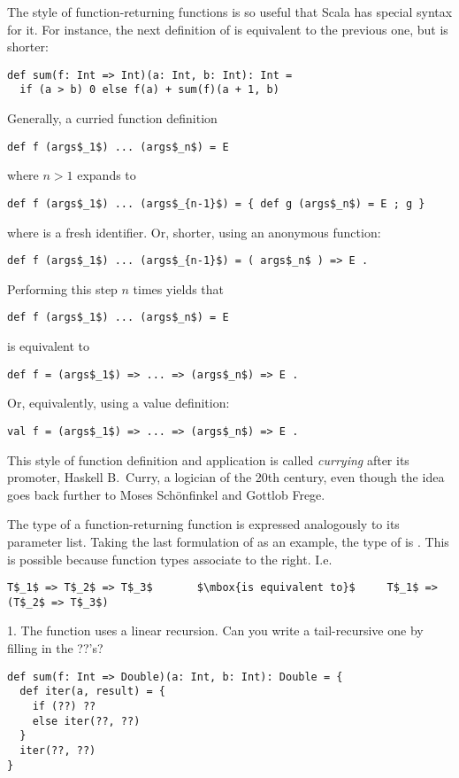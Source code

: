 The style of function-returning functions is so useful that Scala has
special syntax for it. For instance, the next definition of 
is equivalent to the previous one, but is shorter:
\begin{lstlisting}
def sum(f: Int => Int)(a: Int, b: Int): Int =
  if (a > b) 0 else f(a) + sum(f)(a + 1, b)
\end{lstlisting}
Generally, a curried function definition 
\begin{lstlisting}
def f (args$_1$) ... (args$_n$) = E
\end{lstlisting}
where $n > 1$ expands to
\begin{lstlisting}
def f (args$_1$) ... (args$_{n-1}$) = { def g (args$_n$) = E ; g }
\end{lstlisting}
where  is a fresh identifier. Or, shorter, using an anonymous function:
\begin{lstlisting}
def f (args$_1$) ... (args$_{n-1}$) = ( args$_n$ ) => E .
\end{lstlisting}
Performing this step $n$ times yields that
\begin{lstlisting}
def f (args$_1$) ... (args$_n$) = E
\end{lstlisting}
is equivalent to
\begin{lstlisting}
def f = (args$_1$) => ... => (args$_n$) => E .
\end{lstlisting}
Or, equivalently, using a value definition:
\begin{lstlisting}
val f = (args$_1$) => ... => (args$_n$) => E .
\end{lstlisting}
This style of function definition and application is called {\em
currying} after its promoter, Haskell B.\ Curry, a logician of the
20th century, even though the idea goes back further to Moses
Sch\"onfinkel and Gottlob Frege.

The type of a function-returning function is expressed analogously to
its parameter list. Taking the last formulation of  as an example,
the type of  is .
This is possible because function types associate to the right. I.e.
\begin{lstlisting}
T$_1$ => T$_2$ => T$_3$       $\mbox{is equivalent to}$     T$_1$ => (T$_2$ => T$_3$)
\end{lstlisting}


\begin{exercise}
1. The  function uses a linear recursion. Can you write a
tail-recursive one by filling in the ??'s?

\begin{lstlisting}
def sum(f: Int => Double)(a: Int, b: Int): Double = {
  def iter(a, result) = {
    if (??) ??
    else iter(??, ??)
  }
  iter(??, ??)
}
\end{lstlisting}
\end{exercise}

